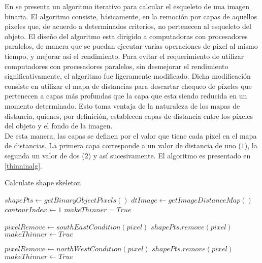En \cite{thinning} se presenta un algoritmo iterativo para calcular el esqueleto de
una imagen binaria. El algoritmo consiste, b\'asicamente, en la remoci\'on por capas
de aquellos pixeles que, de acuerdo a determinados criterios, no pertenecen al esqueleto
del objeto. El dise\~no del algoritmo esta dirigido a computadoras con procesadores 
paralelos, de manera que se puedan ejecutar varias operaciones de pixel al mismo tiempo,
y mejorar as\'i el rendimiento. Para evitar el requerimiento de utilizar computadores
con procesadores paralelos, sin desmejorar el rendimiento significativamente,
el algoritmo fue ligeramente modificado. Dicha modificaci\'on consiste en utilizar
el mapa de distancias para descartar chequeo de p\'ixeles que pertenecen a capas
m\'as profundas que la capa que esta siendo reducida en un momento determinado.
Esto toma ventaja de la naturaleza de los mapas de distancia, quienes, por definici\'on,
establecen capas de distancia entre los p\'ixeles del objeto y el fondo de la imagen.\\
De esta manera, las capas se definen por el valor que tiene cada p\'ixel en el mapa 
de distancias. La primera capa corresponde a un valor de distancia de uno ($1$), la segunda
un valor de dos ($2$) y as\'i sucesivamente. El algoritmo es presentado en \ref{thinninalg}.

\begin{algorithm}                     
\caption{Calculate shape skeleton}         
\label{thinninalg}                    
\begin{algorithmic}                   
\STATE $shapePts \leftarrow getBinaryObjectPixels()$
\STATE $dtImage \leftarrow getImageDistanceMap()$
\STATE $contourIndex \leftarrow 1$
\STATE $makeThinner = True$


\STATE {}
\STATE {}
\ELSE
\STATE $pixelRemove \leftarrow southEastCondition(pixel)$
\STATE $shapePts.remove(pixel)$
\STATE $makeThinner \leftarrow True$
\ENDIF

\ENDIF
\ENDFOR

\STATE {}
\STATE {}
\ELSE
\STATE $pixelRemove \leftarrow northWestCondition(pixel)$
\STATE $shapePts.remove(pixel)$
\STATE $makeThinner \leftarrow True$
\ENDIF
\ENDIF
\ENDFOR
\ENDWHILE
\STATE 
{}

\end{algorithmic}
\end{algorithm}

